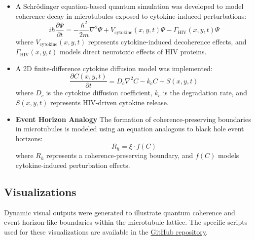 \begin{itemize}
\item A Schrödinger equation-based quantum simulation was developed to model coherence decay in microtubules exposed to cytokine-induced perturbations:
\begin{equation}
    i\hbar \frac{\partial \Psi}{\partial t} = -\frac{\hbar^2}{2m} \nabla^2 \Psi + V_{\text{cytokine}}(x, y, t) \Psi - \Gamma_{\text{HIV}}(x, y, t) \Psi
\end{equation}
where \( V_{\text{cytokine}}(x, y, t) \) represents cytokine-induced decoherence effects, and \( \Gamma_{\text{HIV}}(x, y, t) \) models direct neurotoxic effects of HIV proteins.

\item A 2D finite-difference cytokine diffusion model was implemented:
\begin{equation}
    \frac{\partial C(x, y, t)}{\partial t} = D_c \nabla^2 C - k_c C + S(x, y, t)
\end{equation}
where \( D_c \) is the cytokine diffusion coefficient, \( k_c \) is the degradation rate, and \( S(x, y, t) \) represents HIV-driven cytokine release.

\item \textbf{Event Horizon Analogy} The formation of coherence-preserving boundaries in microtubules is modeled using an equation analogous to black hole event horizons:
\begin{equation}
    R_h = \xi \cdot f(C)
    \label{eq:event_horizon}
\end{equation}
where $R_h$ represents a coherence-preserving boundary, and $f(C)$ models cytokine-induced perturbation effects.
\end{itemize}

\subsection{Visualizations}
Dynamic visual outputs were generated to illustrate quantum coherence and event horizon-like boundaries within the microtubule lattice. The specific scripts used for these visualizations are available in the \href{https://github.com/TheonlyqueenAC/Microtubule_Simulation}{GitHub repository}.
